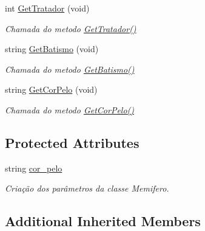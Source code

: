 \begin{DoxyCompactItemize}
\mbox{\label{class_mamifero_aefe8a8e19be80f7486a475b19c4d97ac}} 
int \mbox{\hyperlink{class_mamifero_aefe8a8e19be80f7486a475b19c4d97ac}{Get\+Tratador}} (void)
\begin{DoxyCompactList}\small\item\em Chamada do metodo \mbox{\hyperlink{class_mamifero_aefe8a8e19be80f7486a475b19c4d97ac}{Get\+Tratador()}} \end{DoxyCompactList}\item 
\mbox{\label{class_mamifero_a0b7058dd9e9fc48082935ef0a8e4f1e8}} 
string \mbox{\hyperlink{class_mamifero_a0b7058dd9e9fc48082935ef0a8e4f1e8}{Get\+Batismo}} (void)
\begin{DoxyCompactList}\small\item\em Chamada do metodo \mbox{\hyperlink{class_mamifero_a0b7058dd9e9fc48082935ef0a8e4f1e8}{Get\+Batismo()}} \end{DoxyCompactList}\item 
\mbox{\label{class_mamifero_a1a10413bed9db3c6ddcd39ed55ecc7a2}} 
string \mbox{\hyperlink{class_mamifero_a1a10413bed9db3c6ddcd39ed55ecc7a2}{Get\+Cor\+Pelo}} (void)
\begin{DoxyCompactList}\small\item\em Chamada do metodo \mbox{\hyperlink{class_mamifero_a1a10413bed9db3c6ddcd39ed55ecc7a2}{Get\+Cor\+Pelo()}} \end{DoxyCompactList}\end{DoxyCompactItemize}
\subsection*{Protected Attributes}
\begin{DoxyCompactItemize}
\item 
string \mbox{\hyperlink{class_mamifero_afa5db00bf6dcf9b2e4e4d24f6d51a36c}{cor\+\_\+pelo}}
\begin{DoxyCompactList}\small\item\em Criação dos parâmetros da classe Memifero. \end{DoxyCompactList}\end{DoxyCompactItemize}
\subsection*{Additional Inherited Members}


